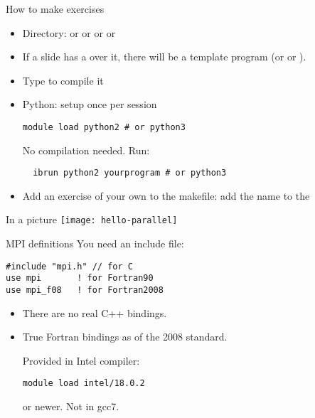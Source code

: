 \begin{frame}[containsverbatim]{How to make exercises}
  \begin{itemize}
  \item Directory:  or  or  or 
    or 
  \item If a slide has a  over it, there will be a
    template program  (or  or ).
  \item Type  to compile it
  \item Python: setup once per session
\begin{verbatim}
module load python2 # or python3
\end{verbatim}
No compilation needed. Run:
\begin{verbatim}
  ibrun python2 yourprogram # or python3
\end{verbatim}
\item Add an exercise of your own to the makefile: add the name to
    the 
  \end{itemize}
\end{frame}

\begin{exerciseframe}[hello]
  
\end{exerciseframe}

\begin{frame}{In a picture}
  \texttt{[image: hello-parallel]}
\end{frame}


\begin{frame}[containsverbatim]{MPI definitions}
You need an include file:
\begin{verbatim}
#include "mpi.h" // for C
use mpi       ! for Fortran90
use mpi_f08   ! for Fortran2008
\end{verbatim}
\begin{itemize}
\item There are no real C++ bindings.
\item True Fortran bindings as of the 2008 standard.
\begin{tacc}
Provided in Intel compiler:
\begin{verbatim}
module load intel/18.0.2
\end{verbatim}
or newer. Not in gcc7.
\end{tacc}
\end{itemize}
\end{frame}

